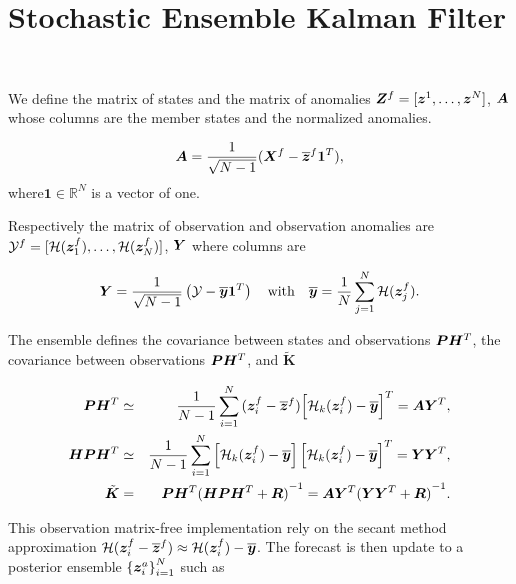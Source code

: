 
\appendix
\section{Stochastic Ensemble Kalman Filter}~\label{appendix:enkf}

We define the matrix of states and the matrix of anomalies $\bm{Z}^f = [\bm{z}^1, \dots, \bm{z}^N]$, $\bm A$ whose columns are the member states and the normalized anomalies.

\begin{equation*}
    \bm A = \frac{1}{\sqrt{N - 1}}(\bm{X}^f - \overline{\bm{z}}^f \bm{1}^T),
\end{equation*}where$\bm{1} \in \mathbb{R}^N$ is a vector of one.

Respectively the matrix of observation and observation anomalies are $\mathcal Y^f = [\mathcal{H}(\bm{z}_1^f), \dots, \mathcal{H}(\bm{z}_N^f)]$, $\bm Y$ where columns are

\begin{equation*}
    \bm Y = \frac{1}{\sqrt{N - 1}} \left(\mathcal Y - \overline{\bm{y}} \bm{1}^T \right) \quad \text{with} \quad \overline{\bm{y}} = \frac{1}{N} \sum_{j=1}^{N} \mathcal{H}(\bm{z}_j^f).
\end{equation*}

The ensemble defines the covariance between states and observations $\bm{P} \bm H^T$, the covariance between observations $\bm{P} \bm H^T$, and $\tilde{\bm{K}}$

\begin{eqnarray*}
    \bm{P} \bm H^T &\simeq& \frac{1}{N - 1} \sum_{i = 1}^{N} {(\bm{z}_i^f - \overline{\bm{z}}^f)} {\left[ \mathcal{H}_k(\bm{z}_i^f) - \overline{\bm{y}}\right]}^T = \bm A \bm Y^T, \\
    \bm H \bm{P} \bm H^T &\simeq& \frac{1}{N -1} \sum_{i = 1}^{N}\left[ \mathcal{H}_k(\bm{z}_i^f) - \overline{\bm{y}}\right] {\left[ \mathcal{H}_k(\bm{z}_i^f) - \overline{\bm{y}}\right]}^T = \bm Y \bm Y^T,\\
    \tilde{\bm{K}} &=& \bm{P} \bm H^T{(\bm H \bm{P} \bm H^T + \bm R)}^{-1} = \bm A \bm Y^T {(\bm Y \bm Y^T + \bm R)}^{-1}.
\end{eqnarray*}

This observation matrix-free implementation rely on the secant method approximation $\mathcal{H}(\bm{z}_i^f - \overline{\bm{z}}^f) \approx \mathcal{H} (\bm z_i^f) - \overline{\bm{y}}$.
The forecast is then update to a posterior ensemble $\left\{\bm{z}_i^a\right\}_{i=1}^{N}$ such as


